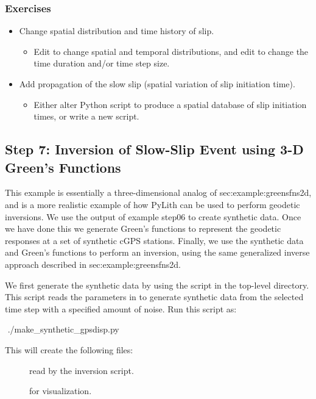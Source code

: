 \subsubsection{Exercises}

\begin{itemize}
\item Change spatial distribution and time history of slip.
  \begin{itemize}
  \item Edit  to change spatial and
    temporal distributions, and edit  to change the
    time duration and/or time step size.
  \end{itemize}
\item Add propagation of the slow slip (spatial variation of slip
  initiation time).
  \begin{itemize}
  \item Either alter Python script to produce a spatial database of
    slip initiation times, or write a new script.
  \end{itemize}
\end{itemize}

\subsection{Step 7: Inversion of Slow-Slip Event using 3-D Green's Functions}

This example is essentially a three-dimensional analog of
{sec:example:greensfns2d}, and is a more realistic example of how
PyLith can be used to perform geodetic inversions. We use the output
of example step06 to create synthetic data. Once we have done this we
generate Green's functions to represent the geodetic responses at a
set of synthetic cGPS stations. Finally, we use the synthetic data and
Green's functions to perform an inversion, using the same generalized
inverse approach described in {sec:example:greensfns2d}.

We first generate the synthetic data by using the script
 in the top-level directory. This
script reads the parameters in 
to generate synthetic data from the selected time step with a
specified amount of noise. Run this script as:
\begin{shell}
$$ ./make_synthetic_gpsdisp.py
\end{shell}
This will create the following files:
\begin{description}
\item[] read by the
  inversion script.
\item[] for visualization.
\end{description}

